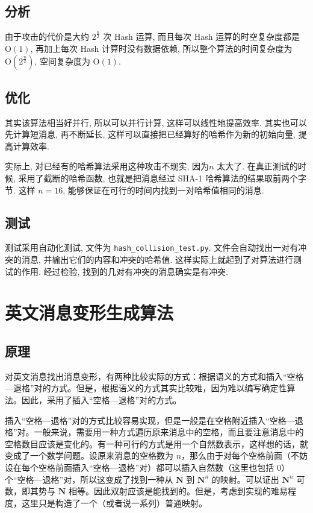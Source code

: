 \documentclass[12pt,a4paper]{article}
\begin{document}
\subsection*{分析}

由于攻击的代价是大约 $ 2^{\frac{n}{2}} $ 次 Hash 运算, 而且每次 Hash 运算的时空复杂度都是 $ \mathrm{O}(1) $, 再加上每次 Hash 计算时没有数据依赖, 所以整个算法的时间复杂度为 $ \mathrm{O}(2^\frac{n}{2}) $, 空间复杂度为 $ \mathrm{O}(1) $. 

\subsection*{优化}

其实该算法相当好并行, 所以可以并行计算, 这样可以线性地提高效率. 其实也可以先计算短消息, 再不断延长, 这样可以直接把已经算好的哈希作为新的初始向量, 提高计算效率. 

实际上, 对已经有的哈希算法采用这种攻击不现实, 因为$ n $ 太大了. 在真正测试的时候, 采用了截断的哈希函数, 也就是把消息经过 SHA-1 哈希算法的结果取前两个字节. 这样 $ n = 16 $, 能够保证在可行的时间内找到一对哈希值相同的消息. 

\subsection*{测试}

测试采用自动化测试, 文件为 \verb|hash_collision_test.py|. 文件会自动找出一对有冲突的消息, 并输出它们的内容和冲突的哈希值. 这样实际上就起到了对算法进行测试的作用. 经过检验, 找到的几对有冲突的消息确实是有冲突. 

\section*{英文消息变形生成算法}

\subsection*{原理}

对英文消息找出消息变形，有两种比较实际的方式：根据语义的方式和插入“空格—退格”对的方式。但是，根据语义的方式其实比较难，因为难以编写确定性算法。因此，采用了插入“空格—退格”对的方式。

插入“空格—退格”对的方式比较容易实现，但是一般是在空格附近插入“空格—退格”对。一般来说，需要用一种方式遍历原来消息中的空格，而且要注意消息中的空格数目应该是变化的。有一种可行的方式是用一个自然数表示，这样想的话，就变成了一个数学问题。设原来消息的空格数为 $ n $，那么由于对每个空格前面（不妨设在每个空格前面插入“空格—退格”对）都可以插入自然数（这里也包括 0）个“空格—退格”对，所以这变成了找到一种从 $ \mathbf{N} $ 到 $ \mathbf{N}^n $ 的映射。可以证出 $ \mathbf{N}^n $ 可数，即其势与 $ \mathbf{N} $ 相等。因此双射应该是能找到的。但是，考虑到实现的难易程度，这里只是构造了一个（或者说一系列）普通映射。
\end{document}
